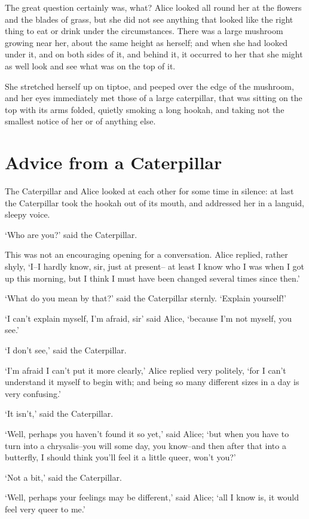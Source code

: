 \documentclass[statementpaper,twoside,openany]{memoir}
\begin{document}
The great question certainly was, what? Alice looked all round her at the flowers and the blades of grass, but she did not see anything that looked like the right thing to eat or drink under the circumstances. There was a large mushroom growing near her, about the same height as herself; and when she had looked under it, and on both sides of it, and behind it, it occurred to her that she might as well look and see what was on the top of it.

She stretched herself up on tiptoe, and peeped over the edge of the mushroom, and her eyes immediately met those of a large caterpillar, that was sitting on the top with its arms folded, quietly smoking a long hookah, and taking not the smallest notice of her or of anything else.

\chapter{Advice from a Caterpillar}

The Caterpillar and Alice looked at each other for some time in silence: at last the Caterpillar took the hookah out of its mouth, and addressed her in a languid, sleepy voice.

`Who are you?' said the Caterpillar.

This was not an encouraging opening for a conversation. Alice replied, rather shyly, `I--I hardly know, sir, just at present-- at least I know who I was when I got up this morning, but I think I must have been changed several times since then.'

`What do you mean by that?' said the Caterpillar sternly. `Explain yourself!'

`I can't explain myself, I'm afraid, sir' said Alice, `because I'm not myself, you see.'

`I don't see,' said the Caterpillar.

`I'm afraid I can't put it more clearly,' Alice replied very politely, `for I can't understand it myself to begin with; and being so many different sizes in a day is very confusing.'

`It isn't,' said the Caterpillar.

`Well, perhaps you haven't found it so yet,' said Alice; `but when you have to turn into a chrysalis--you will some day, you know--and then after that into a butterfly, I should think you'll feel it a little queer, won't you?'

`Not a bit,' said the Caterpillar.

`Well, perhaps your feelings may be different,' said Alice; `all I know is, it would feel very queer to me.'
\end{document}
